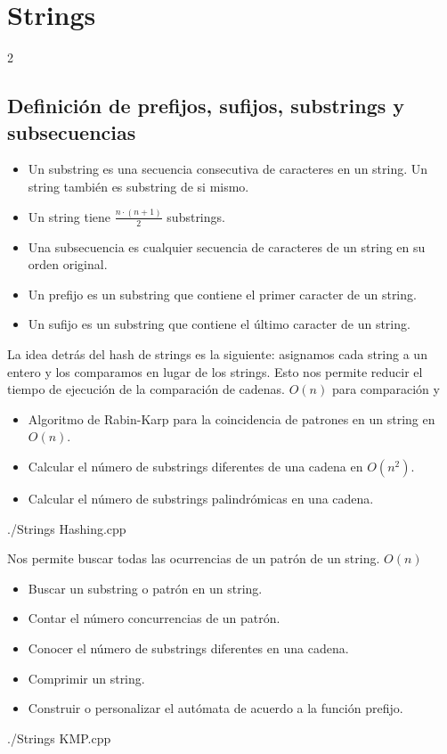 \section{Strings}
\begin{multicols*}{2}
	\subsection{Definición de prefijos, sufijos, substrings y subsecuencias}
	{\begin{itemize}
			\item Un substring es una secuencia consecutiva de caracteres en un string. Un string también es substring de si mismo.
			\item Un string tiene $\frac{n \cdot (n+1)}{2}$ substrings.
			\item Una subsecuencia es cualquier secuencia de caracteres de un string en su orden original.
			\item Un prefijo es un substring que contiene el primer caracter de un string.
			\item Un sufijo es un substring que contiene el último caracter de un string.
		\end{itemize}}
	
	{La idea detrás del hash de strings es la siguiente: asignamos cada string a un entero y los comparamos en lugar de los strings. Esto nos permite reducir el tiempo de ejecución de la comparación de cadenas.}
	{$O(n)$ para comparación y }
	{\begin{itemize}
			\item Algoritmo de Rabin-Karp para la coincidencia de patrones en un string en $O(n)$.
			\item Calcular el número de substrings diferentes de una cadena en $O(n^2)$.
			\item Calcular el número de substrings palindrómicas en una cadena.
		\end{itemize}}
	{./Strings}
	{Hashing.cpp}
	
	{Nos permite buscar todas las ocurrencias de un patrón de un string.}
	{$O(n)$}
	{\begin{itemize}
			\item Buscar un substring o patrón en un string.
			\item Contar el número concurrencias de un patrón.
			\item Conocer el número de substrings diferentes en una cadena.
			\item Comprimir un string.
			\item Construir o personalizar el autómata de acuerdo a la función prefijo.
		\end{itemize}}
	{./Strings}
	{KMP.cpp}
	

\end{multicols*}
